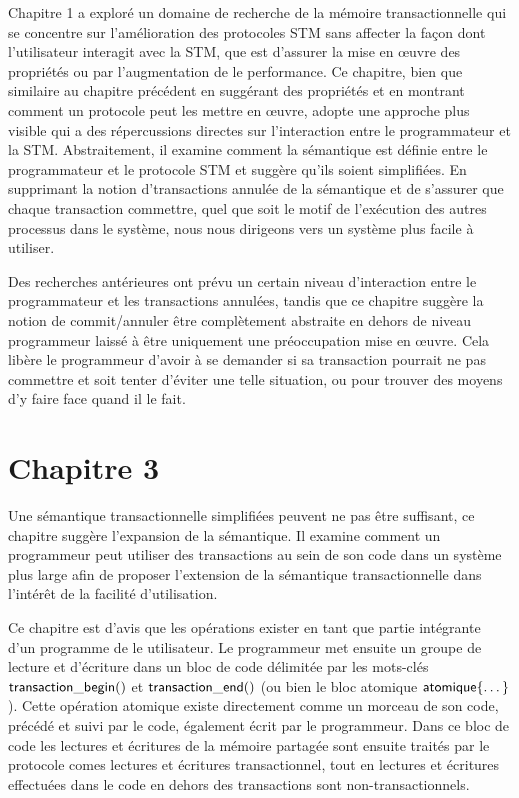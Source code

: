 Chapitre 1 a exploré un domaine de recherche de la mémoire transactionnelle qui se concentre sur
l'amélioration des protocoles STM sans affecter la façon dont l'utilisateur interagit avec la STM,
que est d'assurer la mise en œuvre des propriétés ou par l'augmentation de le performance.
Ce chapitre, bien que similaire au chapitre précédent en suggérant des propriétés et en montrant comment un protocole peut les mettre en œuvre,
adopte une approche plus visible qui a des répercussions directes sur l'interaction entre le programmateur et la STM.
Abstraitement, il examine comment la sémantique est définie entre le programmateur et le protocole STM et suggère qu'ils soient simplifiées.
En supprimant la notion d'transactions annulée de la sémantique et de s'assurer que chaque transaction commettre,
quel que soit le motif de l'exécution des autres processus dans le système, nous nous dirigeons vers un système plus facile à utiliser.


Des recherches antérieures ont prévu un certain niveau d'interaction entre le programmateur et les transactions annulées,
tandis que ce chapitre suggère la notion de commit/annuler être complètement abstraite en dehors de niveau programmeur laissé à être uniquement une préoccupation mise en œuvre.
Cela libère le programmeur d'avoir à se demander si sa transaction pourrait ne pas commettre et soit tenter d'éviter une telle situation, ou pour trouver des moyens d'y faire face quand il le fait.


\section{Chapitre 3}

Une sémantique transactionnelle simplifiées peuvent ne pas être suffisant, ce chapitre suggère l'expansion de la sémantique.
Il examine comment un programmeur peut utiliser des transactions au sein de son code dans un système plus large afin de proposer
l'extension de la sémantique transactionnelle dans l'intérêt de la facilité d'utilisation.


Ce chapitre est d'avis que les opérations exister en tant que partie intégrante d'un programme de le utilisateur.
Le programmeur met ensuite un groupe de lecture et d'écriture dans un bloc de code délimitée par les mots-clés
$\act{transaction\_begin}()$ et $\act{transaction\_end}()$ (ou bien le bloc atomique $\act{atomique}\{ \dots \} $).
Cette opération atomique existe directement comme un morceau de son code, précédé et suivi par le code, également écrit par le programmeur.
Dans ce bloc de code les lectures et écritures de la mémoire partagée sont ensuite traités par le protocole comes lectures et écritures transactionnel,
tout en lectures et écritures effectuées dans le code en dehors des transactions sont non-transactionnels.


